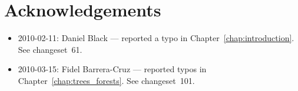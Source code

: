 
\chapter{Acknowledgements}

\begin{itemize}
\item 2010-02-11: Daniel Black --- reported a typo in
  Chapter~\ref{chap:introduction}. See changeset~61.

\item 2010-03-15: Fidel Barrera-Cruz --- reported typos in
  Chapter~\ref{chap:trees_forests}. See changeset~101.
\end{itemize}
